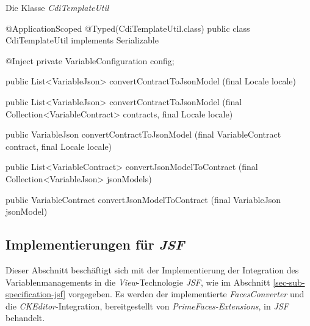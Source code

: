 \begin{program}[h]
\caption{Die Klasse \emph{CdiTemplateUtil}}
\label{prog:cdiTemplateUtil}
\begin{JavaCode}
@ApplicationScoped
@Typed(CdiTemplateUtil.class)
public class CdiTemplateUtil implements Serializable {
    @Inject
    private VariableConfiguration config;

    public List<VariableJson> convertContractToJsonModel
                                    (final Locale locale) { }

    public List<VariableJson> convertContractToJsonModel
           (final Collection<VariableContract> contracts,
            final Locale                          locale) { }

    public VariableJson convertContractToJsonModel
                  (final VariableContract contract,
                   final Locale             locale) { }
	
    public List<VariableContract> convertJsonModelToContract
                  (final Collection<VariableJson> jsonModels) { }

    public VariableContract convertJsonModelToContract
                        (final VariableJson jsonModel) { }
}
\end{JavaCode}
\end{program}

\subsection{Implementierungen für \emph{JSF}}
\label{sec:sub-impl-integartion-jsf}
Dieser Abschnitt beschäftigt sich mit der Implementierung der Integration des Variablenmanagements in die \emph{View}-Technologie \emph{JSF}, wie im Abschnitt \ref{sec-sub-specification-jsf} vorgegeben. Es werden der implementierte \emph{FacesConverter} und die \emph{CKEditor}-Integration, bereitgestellt von \emph{PrimeFaces-Extensions}, in \emph{JSF} behandelt.

